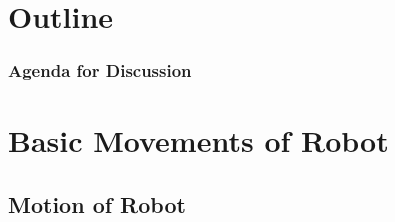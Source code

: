 \documentclass[table,10pt,red]{beamer}
\title
[
	Firebird LPC2148 Robotics Research Platform	%
	\hspace{0.5cm}
	\insertframenumber/\inserttotalframenumber
]
{
	Motion Control Of Firebird-V Robot
}
\author
[
	www.e-yantra.org
]
{
	e-Yantra Team \\
  Embedded Real-Time Systems Lab\\
  Indian Institute of Technology-Bombay \\
}
\date
{
IIT Bombay \\ {\today}
}
\begin{document}
 

\begin{frame}
	\titlepage
\end{frame} 

\section*{Outline}
\begin{frame}
	\frametitle{Agenda for Discussion}
	\tableofcontents
\end{frame} 

\section{Basic Movements of Robot}
\subsection{Motion of Robot}
\end{document}
